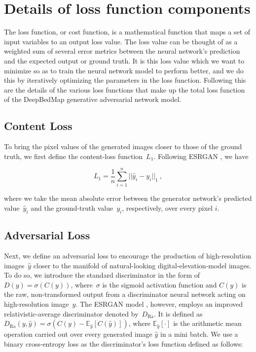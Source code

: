 
\chapter{Details of loss function components}
\label{appendix:A}

The loss function, or cost function, is a mathematical function that maps a set of input variables to an output loss value.
The loss value can be thought of as a weighted sum of several error metrics between the neural network's prediction and the expected output or ground truth.
It is this loss value which we want to minimize so as to train the neural network model to perform better, and we do this by iteratively optimizing the parameters in the loss function.
Following this are the details of the various loss functions that make up the total loss function of the DeepBedMap generative adversarial network model.

\section{Content Loss}

To bring the pixel values of the generated images closer to those of the ground truth, we first define the content-loss function~$L_1$.
Following ESRGAN \citep{WangESRGANEnhancedSuperResolution2019}, we have

\begin{equation}\label{eq:A1}
  L_1 = \dfrac{1}{n} \sum\limits_{i=1}^n ||\hat{y}_i - y_i||_{1}~,
\end{equation}

where we take the mean absolute error between the generator network's predicted value~$\hat{y}_i$ and the ground-truth value~$y_i$, respectively, over every pixel $i$.

\section{Adversarial Loss}

Next, we define an adversarial loss to encourage the production of high-resolution images~$\hat{y}$ closer to the manifold of natural-looking digital-elevation-model images.
To do so, we introduce the standard discriminator in the form of $D(y) = \sigma(C(y))$, where~$\sigma$ is the sigmoid activation function and $C(y)$ is the raw, non-transformed output from a discriminator neural network acting on high-resolution image~$y$.
The ESRGAN model \citep{WangESRGANEnhancedSuperResolution2019}, however, employs an improved relativistic-average discriminator \citep{Jolicoeur-Martineaurelativisticdiscriminatorkey2018} denoted by~$D_{\text{Ra}}$.
It is defined as $D_{\text{Ra}}(y,\hat{y}) = \sigma(C(y) - \mathbb{E}_{\hat{y}}[C(\hat{y})])$, where $\mathbb{E}_{\hat{y}}[\cdot]$ is the arithmetic mean operation carried out over every generated image $\hat{y}$ in a mini batch.
We use a binary cross-entropy loss as the discriminator's loss function defined as follows:

